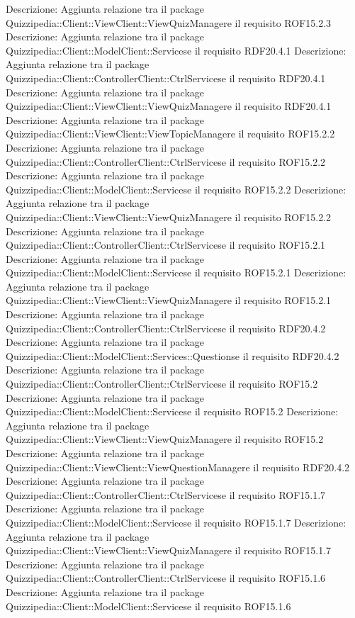 Descrizione: Aggiunta relazione tra il package Quizzipedia::Client::ViewClient::ViewQuizManagere il requisito ROF15.2.3 
Descrizione: Aggiunta relazione tra il package Quizzipedia::Client::ModelClient::Servicese il requisito RDF20.4.1 
Descrizione: Aggiunta relazione tra il package Quizzipedia::Client::ControllerClient::CtrlServicese il requisito RDF20.4.1 
Descrizione: Aggiunta relazione tra il package Quizzipedia::Client::ViewClient::ViewQuizManagere il requisito RDF20.4.1 
Descrizione: Aggiunta relazione tra il package Quizzipedia::Client::ViewClient::ViewTopicManagere il requisito ROF15.2.2 
Descrizione: Aggiunta relazione tra il package Quizzipedia::Client::ControllerClient::CtrlServicese il requisito ROF15.2.2 
Descrizione: Aggiunta relazione tra il package Quizzipedia::Client::ModelClient::Servicese il requisito ROF15.2.2 
Descrizione: Aggiunta relazione tra il package Quizzipedia::Client::ViewClient::ViewQuizManagere il requisito ROF15.2.2 
Descrizione: Aggiunta relazione tra il package Quizzipedia::Client::ControllerClient::CtrlServicese il requisito ROF15.2.1 
Descrizione: Aggiunta relazione tra il package Quizzipedia::Client::ModelClient::Servicese il requisito ROF15.2.1 
Descrizione: Aggiunta relazione tra il package Quizzipedia::Client::ViewClient::ViewQuizManagere il requisito ROF15.2.1 
Descrizione: Aggiunta relazione tra il package Quizzipedia::Client::ControllerClient::CtrlServicese il requisito RDF20.4.2 
Descrizione: Aggiunta relazione tra il package Quizzipedia::Client::ModelClient::Services::Questionse il requisito RDF20.4.2 
Descrizione: Aggiunta relazione tra il package Quizzipedia::Client::ControllerClient::CtrlServicese il requisito ROF15.2 
Descrizione: Aggiunta relazione tra il package Quizzipedia::Client::ModelClient::Servicese il requisito ROF15.2 
Descrizione: Aggiunta relazione tra il package Quizzipedia::Client::ViewClient::ViewQuizManagere il requisito ROF15.2 
Descrizione: Aggiunta relazione tra il package Quizzipedia::Client::ViewClient::ViewQuestionManagere il requisito RDF20.4.2 
Descrizione: Aggiunta relazione tra il package Quizzipedia::Client::ControllerClient::CtrlServicese il requisito ROF15.1.7 
Descrizione: Aggiunta relazione tra il package Quizzipedia::Client::ModelClient::Servicese il requisito ROF15.1.7 
Descrizione: Aggiunta relazione tra il package Quizzipedia::Client::ViewClient::ViewQuizManagere il requisito ROF15.1.7 
Descrizione: Aggiunta relazione tra il package Quizzipedia::Client::ControllerClient::CtrlServicese il requisito ROF15.1.6 
Descrizione: Aggiunta relazione tra il package Quizzipedia::Client::ModelClient::Servicese il requisito ROF15.1.6 
